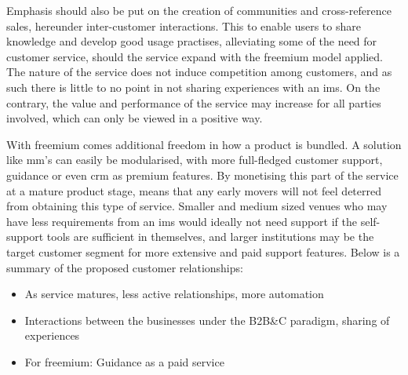 \begin{table}[]
\centering
\caption{Customer relationships for different product phases, freemium model}
\label{relationshipstrat}
\end{table}

Emphasis should also be put on the creation of communities and cross-reference sales, hereunder inter-customer interactions. This to enable users to share knowledge and develop good usage practises, alleviating some of the need for customer service, should the service expand with the freemium model applied. The nature of the service does not induce competition among customers, and as such there is little to no point in not sharing experiences with an \gls{ims}. On the contrary, the value and performance of the service may increase for all parties involved, which can only be viewed in a positive way. 


With freemium comes additional freedom in how a product is bundled. A solution like \gls{mm}'s can easily be modularised, with more full-fledged customer support, guidance or even \gls{crm} as premium features. By monetising this part of the service at a mature product stage, means that any early movers will not feel deterred from obtaining this type of service. Smaller and medium sized venues who may have less requirements from an \gls{ims} would ideally not need support if the self-support tools are sufficient in themselves, and larger institutions may be the target customer segment for more extensive and paid support features. Below is a summary of the proposed customer relationships:

\begin{itemize}
    \item As service matures, less active relationships, more automation
    \item Interactions between the businesses under the B2B\&C paradigm, sharing of experiences
    \item For freemium: Guidance as a paid service
\end{itemize}

